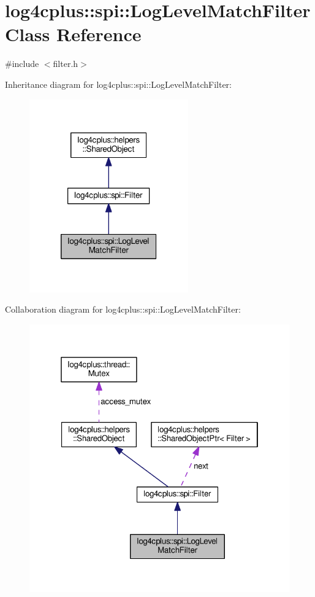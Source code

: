 \hypertarget{classlog4cplus_1_1spi_1_1LogLevelMatchFilter}{\section{log4cplus\-:\-:spi\-:\-:Log\-Level\-Match\-Filter Class Reference}
\label{classlog4cplus_1_1spi_1_1LogLevelMatchFilter}
}


{\ttfamily \#include $<$filter.\-h$>$}



Inheritance diagram for log4cplus\-:\-:spi\-:\-:Log\-Level\-Match\-Filter\-:
\nopagebreak
\begin{figure}[H]
\begin{center}
\leavevmode
\includegraphics[width=194pt]{classlog4cplus_1_1spi_1_1LogLevelMatchFilter__inherit__graph}
\end{center}
\end{figure}


Collaboration diagram for log4cplus\-:\-:spi\-:\-:Log\-Level\-Match\-Filter\-:
\nopagebreak
\begin{figure}[H]
\begin{center}
\leavevmode
\includegraphics[width=321pt]{classlog4cplus_1_1spi_1_1LogLevelMatchFilter__coll__graph}
\end{center}
\end{figure}
